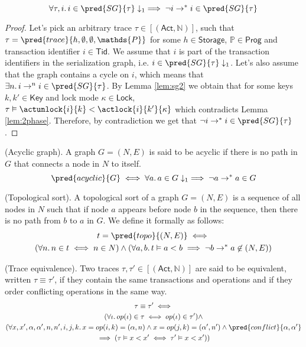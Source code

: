 \thm
\[
\forall \tau, i \ldotp i \in \pred{SG}{\tau} \downarrow_1 \implies \lnot i \rightarrow^* i \in \pred{SG}{\tau}
\]

\begin{proof}
Let's pick an arbitrary trace $\tau \in [(\mathsf{Act}, \mathds{N})]$, such that $\tau = \pred{trace}{h, \emptyset, \emptyset, \mathds{P}}$ for some $h \in \mathsf{Storage}$, $\mathds{P} \in \mathsf{Prog}$ and transaction identifier $i \in \mathsf{Tid}$. We assume that $i$ is part of the transaction identifiers in the serialization graph, i.e. $i \in \pred{SG}{\tau} \downarrow_1$. Let's also assume that the graph contains a cycle on $i$, which means that $\exists n \ldotp i \rightarrow^n i \in \pred{SG}{\tau}$. By Lemma \ref{lem:sg2} we obtain that for some keys $k, k' \in \mathsf{Key}$ and lock mode $\kappa \in \mathsf{Lock}$, $\tau \vDash \actunlock{i}{k} < \actlock{i}{k'}{\kappa}$ which contradicts Lemma \ref{lem:2phase}. Therefore, by contradiction we get that $\lnot i \rightarrow^* i \in \pred{SG}{\tau}$.
\end{proof}

 (Acyclic graph). A graph $G = (N, E)$ is said to be acyclic if there is no path in $G$ that connects a node in $N$ to itself.
\[
	\pred{acyclic}{G} \iff \forall a \ldotp a \in G \downarrow_1 \implies \lnot a \rightarrow^* a \in G
\]

 (Topological sort). A topological sort of a graph $G = (N, E)$ is a sequence of all nodes in $N$ such that if node $a$ appears before node $b$ in the sequence, then there is no path from $b$ to $a$ in $G$. We define it formally as follows:
\begin{gather*}
	t = \pred{topo}{(N, E)} \iff \\
	(\forall n \ldotp n \in t \iff n \in N) \land (\forall a, b \ldotp t \vDash a < b \implies \lnot b \rightarrow^* a \not\in (N, E))
\end{gather*}

 (Trace equivalence). Two traces $\tau, \tau' \in [(\mathsf{Act}, \mathds{N})]$ are said to be equivalent, written $\tau \equiv \tau'$, if they contain the same transactions and operations and if they order conflicting operations in the same way.
\begin{gather*}
	\tau \equiv \tau' \iff \\
	(\forall \iota \ldotp op(\iota) \in \tau \iff op(\iota) \in \tau') \land \\
	(\forall x, x', \alpha, \alpha', n, n', i, j, k \ldotp x = op(i, k) = (\alpha, n) \land x = op(j, k) = (\alpha', n') \land \pred{conflict}{\alpha, \alpha'} \\
	\implies (\tau \vDash x < x' \iff \tau' \vDash x < x'))
\end{gather*}


